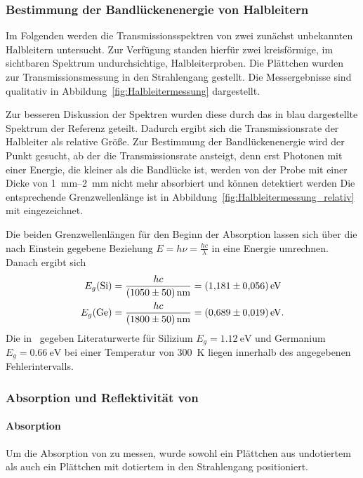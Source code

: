\documentclass[a4paper,twoside,final]{article}
\begin{document}


\clearpage
\subsubsection{Bestimmung der Bandlückenenergie von Halbleitern}

Im Folgenden werden die Transmissionsspektren von zwei zunächst unbekannten Halbleitern untersucht. Zur Verfügung standen hierfür zwei kreisförmige, im sichtbaren Spektrum undurchsichtige, Halbleiterproben. Die Plättchen wurden zur Transmissionsmessung in den Strahlengang gestellt. Die Messergebnisse sind qualitativ in Abbildung~\ref{fig:Halbleitermessung} dargestellt.



Zur besseren Diskussion der Spektren wurden diese durch das in blau dargestellte Spektrum der Referenz geteilt. Dadurch ergibt sich die Transmissionsrate der Halbleiter als relative Größe. Zur Bestimmung der Bandlückenenergie wird der Punkt gesucht, ab der die Transmissionsrate ansteigt, denn erst Photonen mit einer Energie, die kleiner als die Bandlücke ist, werden von der Probe mit einer Dicke von \SIrange{1}{2}{\milli\metre} nicht mehr absorbiert und können detektiert werden Die entsprechende Grenzwellenlänge ist in Abbildung~\ref{fig:Halbleitermessung_relativ} mit eingezeichnet.



Die beiden Grenzwellenlängen für den Beginn der Absorption lassen sich über die nach Einstein gegebene Beziehung $E = h \nu = \frac{h c}{\lambda}$ in eine Energie umrechnen. Danach ergibt sich
\begin{align}
  E_g(\ce{Si}) &= \frac{h c}{\SI{1050\pm50}{\nano\metre}} = \SI{1.181\pm0.056}{\electronvolt}\\
  E_g(\ce{Ge}) &= \frac{h c}{\SI{1800\pm50}{\nano\metre}} = \SI{0.689\pm0.019}{\electronvolt}.
\end{align}
Die in~\cite{Hunklinger} gegeben Literaturwerte für Silizium $E_g = \SI{1.12}{\electronvolt}$ und Germanium $E_g = \SI{0.66}{\electronvolt}$ bei einer Temperatur von \SI{300}{\kelvin} liegen innerhalb des angegebenen Fehlerintervalls.

\subsubsection{Absorption und Reflektivität von }
\paragraph{Absorption}
Um die Absorption von  zu messen, wurde sowohl ein Plättchen aus undotiertem als auch ein Plättchen mit dotiertem  in den Strahlengang positioniert.
\end{document}
